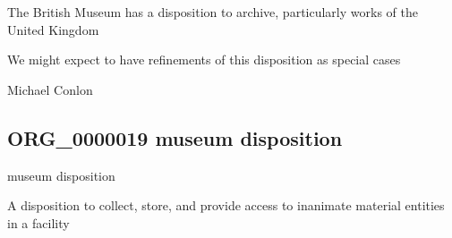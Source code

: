 \documentclass[letterpaper,10pt,english]{sphinxmanual}
\begin{document}
\begin{sphinxShadowBox}

\sphinxAtStartPar
The British Museum has a disposition to archive, particularly works of the United Kingdom
\end{sphinxShadowBox}

\begin{sphinxShadowBox}

\sphinxAtStartPar
We might expect to have refinements of this disposition as special cases
\end{sphinxShadowBox}

\begin{sphinxShadowBox}

\sphinxAtStartPar
Michael Conlon 
\end{sphinxShadowBox}
\begin{quote}

\ignorespaces \end{quote}


\subsection{ORG\_0000019 \sphinxhyphen{} museum disposition}
\label{\detokenize{doc-ORG_0000019:org-0000019-museum-disposition}}\label{\detokenize{doc-ORG_0000019:index-0}}\label{\detokenize{doc-ORG_0000019::doc}}
\begin{sphinxShadowBox}

\sphinxAtStartPar
museum disposition
\end{sphinxShadowBox}

\begin{sphinxShadowBox}

\sphinxAtStartPar
{\hyperref[\detokenize{doc-BFO_0000016::doc}]{}}
\end{sphinxShadowBox}

\begin{sphinxShadowBox}

\sphinxAtStartPar
A disposition to collect, store, and provide access to inanimate material entities in a facility
\end{sphinxShadowBox}
\end{document}
